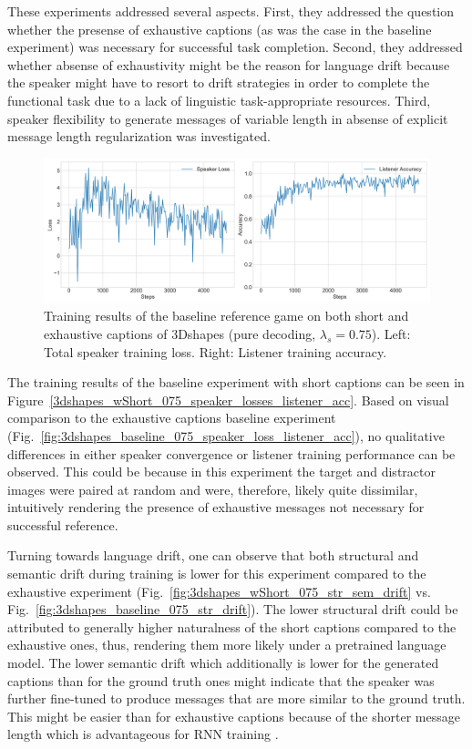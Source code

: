 These experiments addressed several aspects. First, they addressed the question whether the presense of exhaustive captions (as was the case in the baseline experiment) was necessary for successful task completion. Second, they addressed whether absense of exhaustivity might be the reason for language drift because the speaker might have to resort to drift strategies in order to complete the functional task due to a lack of linguistic task-appropriate resources. 
Third, speaker flexibility to generate messages of variable length in absense of explicit message length regularization was investigated. 

\begin{figure}
	\centering
	\includegraphics[width=\linewidth]{images/3dshapes_wShort_baseline_random_075_losses.png}
	\caption{Training results of the baseline reference game on both short and exhaustive captions of 3Dshapes (pure decoding, $\lambda_s=0.75$). Left: Total speaker training loss. Right: Listener training accuracy.}
	\label{fig:3dshapes_wShort_075_speaker_losses_listener_acc}
\end{figure}

The training results of the baseline experiment with short captions can be seen in Figure~\ref{3dshapes_wShort_075_speaker_losses_listener_acc}. Based on visual comparison to the exhaustive captions baseline experiment (Fig.~\ref{fig:3dshapes_baseline_075_speaker_loss_listener_acc}), no qualitative differences in either speaker convergence or listener training performance can be observed. 
This could be because in this experiment the target and distractor images were paired at random and were, therefore, likely quite dissimilar, intuitively rendering the presence of exhaustive messages not necessary for successful reference.

Turning towards language drift, one can observe that both structural and semantic drift during training is lower for this experiment compared to the exhaustive experiment (Fig.~\ref{fig:3dshapes_wShort_075_str_sem_drift} vs. Fig.~\ref{fig:3dshapes_baseline_075_str_drift}). The lower structural drift could be attributed to generally higher naturalness of the short captions compared to the exhaustive ones, thus, rendering them more likely under a pretrained language model. The lower semantic drift which additionally is lower for the generated captions than for the ground truth ones might indicate that the speaker was further fine-tuned to produce messages that are more similar to the ground truth. This might be easier than for exhaustive captions because of the shorter message length which is advantageous for RNN training \parencite[cf.][]{jaeger2002tutorial}.

